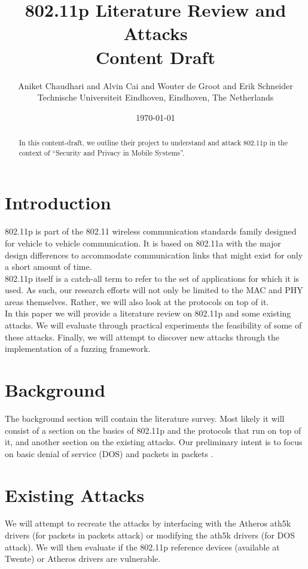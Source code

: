 \documentclass[conference]{IEEEtran}
\title{802.11p Literature Review and Attacks
\\Content Draft}
\author{Aniket Chaudhari and Alvin Cai and Wouter de Groot and Erik Schneider\\
Technische Universiteit Eindhoven, Eindhoven, The Netherlands}
\date{\today}
\begin{document}
\maketitle

\begin{abstract}
In this content-draft, we outline their project to understand and attack 802.11p in the context of “Security and Privacy in Mobile Systems”.
\end{abstract}

\section{Introduction}
802.11p is part of the 802.11 wireless communication standards family designed for vehicle to vehicle communication. It is based on 802.11a with the major design differences to accommodate communication links that might exist for only a short amount of time.\\

802.11p itself is a catch-all term to refer to the set of applications for which it is used. As such, our research efforts will not only be limited to the MAC and PHY areas themselves. Rather, we will also look at the protocols on top of it.\\

In this paper we will provide a literature review on 802.11p and some existing attacks. We will evaluate through practical experiments the feasibility of some of these attacks. Finally, we will attempt to discover new attacks through the implementation of a fuzzing framework.


\section{Background}
The background section will contain the literature survey. Most likely it will consist of a section on the basics of 802.11p and the protocols that run on top of it, and another section on the existing attacks. Our preliminary intent is to focus on basic denial of service (DOS) and packets in packets \cite{goodspeed11}.

\section{Existing Attacks}
\label{sec:existing_attacks}
We will attempt to recreate the attacks by interfacing with the Atheros ath5k drivers (for packets in packets attack) or modifying the ath5k drivers (for DOS attack). We will then evaluate if the 802.11p reference devices (available at Twente) or Atheros drivers are vulnerable.\\
\end{document}
